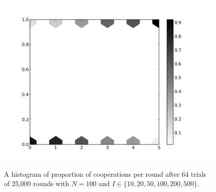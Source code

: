 \documentclass{amsart}
\begin{document}
\begin{figure}[h]
\caption{A histogram of proportion of cooperations per round after 64
  trials of 25,000 rounds with $N=100$ and $I \in
  \{10,20,50,100,200,500\}$.}

\includegraphics[width=\textwidth]{pop100iter.png}
\label{fig:pop100iter}
\end{figure}
\end{document}
